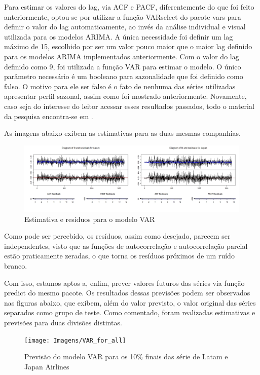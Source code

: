 \documentclass[12pt]{article}
\begin{document}
	 Para estimar os valores do \textrm{lag}, via ACF e PACF, diferentemente do que foi feito anteriormente, optou-se por utilizar a função \textrm{VARselect} do pacote \textrm{vars} \cite{CRANR} para definir o valor do \textrm{lag} automaticamente, ao invés da análise individual e visual utilizada para os modelos ARIMA. A única necessidade foi definir um \textrm{lag} máximo de 15, escolhido por ser um valor pouco maior que o maior \textrm{lag} definido para os modelos ARIMA implementados anteriormente. Com o valor do \textrm{lag} definido como 9, foi utilizada a função \textrm{VAR} para estimar o modelo. O único parâmetro necessário é um booleano para sazonalidade que foi definido como falso. O motivo para ele ser falso é o fato de nenhuma das séries utilizadas apresentar perfil sazonal, assim como foi mostrado anteriormente. Novamente, caso seja do interesse do leitor acessar esses resultados passados, todo o material da pesquisa encontra-se em \cite{git}.
	 
	 As imagens abaixo exibem as estimativas para as duas mesmas companhias.
	 
	 \begin{figure}[H]
	 	\centering
	 	\includegraphics[width=1.0\linewidth]{Imagens/VAR_EST}
	 	\caption{Estimativa e resíduos para o modelo VAR}
	 	\label{fig:varest}
	 \end{figure}
	 
	 Como pode ser percebido, os resíduos, assim como desejado, parecem ser independentes, visto que as funções de autocorrelação e autocorrelação parcial estão praticamente zeradas, o que torna os resíduos próximos de um ruído branco.
	 
	 Com isso, estamos aptos a, enfim, prever valores futuros das séries via função \textrm{predict} do mesmo pacote. Os resultados dessas previsões podem ser observados nas figuras abaixo, que exibem, além do valor previsto, o valor original das séries separados como grupo de teste. Como comentado, foram realizadas estimativas e previsões para duas divisões distintas.
	 
	 \begin{figure}[H]
	 	\centering
	 	\texttt{[image: Imagens/VAR\_for\_all]}
	 	\caption{Previsão do modelo VAR para os 10\% finais das série de Latam e Japan Airlines}
	 	\label{fig:varforall}
	 \end{figure}
	 
\end{document}

